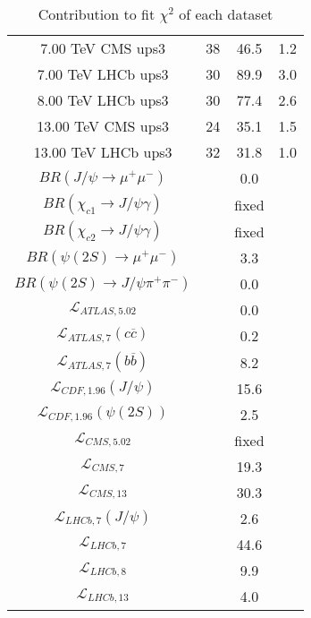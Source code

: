 \begin{table}[h!]
\begin{tabular}{c|c|c|c}
7.00 TeV CMS ups3 & 38 & 46.5 & 1.2 \\
7.00 TeV LHCb ups3 & 30 & 89.9 & 3.0 \\
8.00 TeV LHCb ups3 & 30 & 77.4 & 2.6 \\
13.00 TeV CMS ups3 & 24 & 35.1 & 1.5 \\
13.00 TeV LHCb ups3 & 32 & 31.8 & 1.0 \\
\hline
$BR(J/\psi\rightarrow\mu^+\mu^-)$ &  & 0.0 &  \\
$BR(\chi_{c1}\rightarrow J/\psi\gamma)$ &  & fixed & \\
$BR(\chi_{c2}\rightarrow J/\psi\gamma)$ &  & fixed & \\
$BR(\psi(2S)\rightarrow\mu^+\mu^-)$ &  & 3.3 &  \\
$BR(\psi(2S)\rightarrow J/\psi\pi^+\pi^-)$ &  & 0.0 &  \\
$\mathcal L_{ATLAS,5.02}$ &  & 0.0 &  \\
$\mathcal L_{ATLAS,7}(c\overline c)$ &  & 0.2 &  \\
$\mathcal L_{ATLAS,7}(b\overline b)$ &  & 8.2 &  \\
$\mathcal L_{CDF,1.96}(J/\psi)$ &  & 15.6 &  \\
$\mathcal L_{CDF,1.96}(\psi(2S))$ &  & 2.5 &  \\
$\mathcal L_{CMS,5.02}$ &  & fixed & \\
$\mathcal L_{CMS,7}$ &  & 19.3 &  \\
$\mathcal L_{CMS,13}$ &  & 30.3 &  \\
$\mathcal L_{LHCb,7}(J/\psi)$ &  & 2.6 &  \\
$\mathcal L_{LHCb,7}$ &  & 44.6 &  \\
$\mathcal L_{LHCb,8}$ &  & 9.9 &  \\
$\mathcal L_{LHCb,13}$ &  & 4.0 &  \\
\end{tabular}
\caption{Contribution to fit $\chi^2$ of each dataset}
\end{table}

